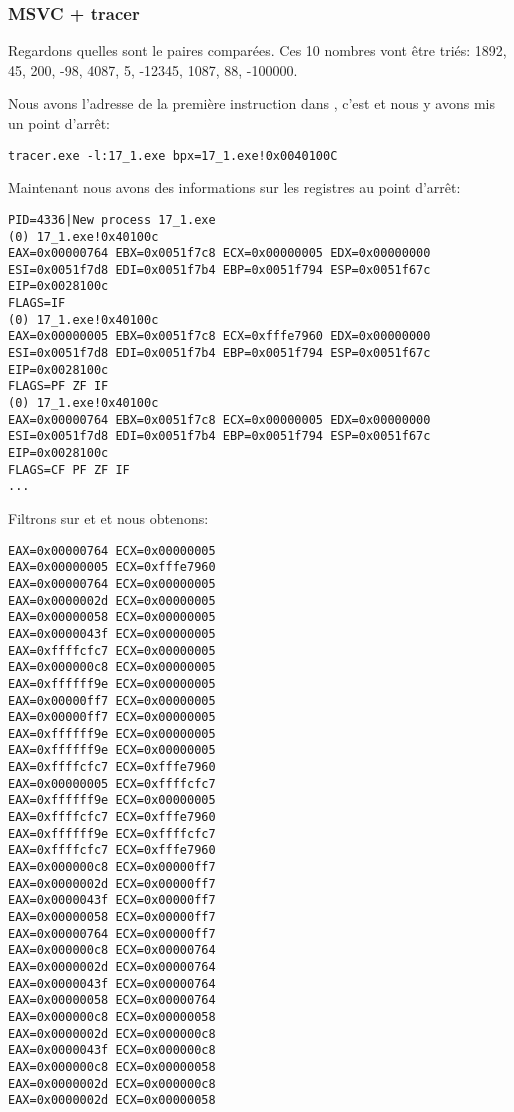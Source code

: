 

\subsubsection{MSVC + tracer}

Regardons quelles sont le paires comparées.
Ces 10 nombres vont être triés:
1892, 45, 200, -98, 4087, 5, -12345, 1087, 88, -100000.

Nous avons l'adresse de la première instruction \CMP dans \comp, c'est 
et nous y avons mis un point d'arrêt:

\begin{lstlisting}
tracer.exe -l:17_1.exe bpx=17_1.exe!0x0040100C
\end{lstlisting}

Maintenant nous avons des informations sur les registres au point d'arrêt:

\begin{lstlisting}
PID=4336|New process 17_1.exe
(0) 17_1.exe!0x40100c
EAX=0x00000764 EBX=0x0051f7c8 ECX=0x00000005 EDX=0x00000000
ESI=0x0051f7d8 EDI=0x0051f7b4 EBP=0x0051f794 ESP=0x0051f67c
EIP=0x0028100c
FLAGS=IF
(0) 17_1.exe!0x40100c
EAX=0x00000005 EBX=0x0051f7c8 ECX=0xfffe7960 EDX=0x00000000
ESI=0x0051f7d8 EDI=0x0051f7b4 EBP=0x0051f794 ESP=0x0051f67c
EIP=0x0028100c
FLAGS=PF ZF IF
(0) 17_1.exe!0x40100c
EAX=0x00000764 EBX=0x0051f7c8 ECX=0x00000005 EDX=0x00000000
ESI=0x0051f7d8 EDI=0x0051f7b4 EBP=0x0051f794 ESP=0x0051f67c
EIP=0x0028100c
FLAGS=CF PF ZF IF
...
\end{lstlisting}

Filtrons sur  et  et nous obtenons:

\begin{lstlisting}
EAX=0x00000764 ECX=0x00000005
EAX=0x00000005 ECX=0xfffe7960
EAX=0x00000764 ECX=0x00000005
EAX=0x0000002d ECX=0x00000005
EAX=0x00000058 ECX=0x00000005
EAX=0x0000043f ECX=0x00000005
EAX=0xffffcfc7 ECX=0x00000005
EAX=0x000000c8 ECX=0x00000005
EAX=0xffffff9e ECX=0x00000005
EAX=0x00000ff7 ECX=0x00000005
EAX=0x00000ff7 ECX=0x00000005
EAX=0xffffff9e ECX=0x00000005
EAX=0xffffff9e ECX=0x00000005
EAX=0xffffcfc7 ECX=0xfffe7960
EAX=0x00000005 ECX=0xffffcfc7
EAX=0xffffff9e ECX=0x00000005
EAX=0xffffcfc7 ECX=0xfffe7960
EAX=0xffffff9e ECX=0xffffcfc7
EAX=0xffffcfc7 ECX=0xfffe7960
EAX=0x000000c8 ECX=0x00000ff7
EAX=0x0000002d ECX=0x00000ff7
EAX=0x0000043f ECX=0x00000ff7
EAX=0x00000058 ECX=0x00000ff7
EAX=0x00000764 ECX=0x00000ff7
EAX=0x000000c8 ECX=0x00000764
EAX=0x0000002d ECX=0x00000764
EAX=0x0000043f ECX=0x00000764
EAX=0x00000058 ECX=0x00000764
EAX=0x000000c8 ECX=0x00000058
EAX=0x0000002d ECX=0x000000c8
EAX=0x0000043f ECX=0x000000c8
EAX=0x000000c8 ECX=0x00000058
EAX=0x0000002d ECX=0x000000c8
EAX=0x0000002d ECX=0x00000058
\end{lstlisting}


